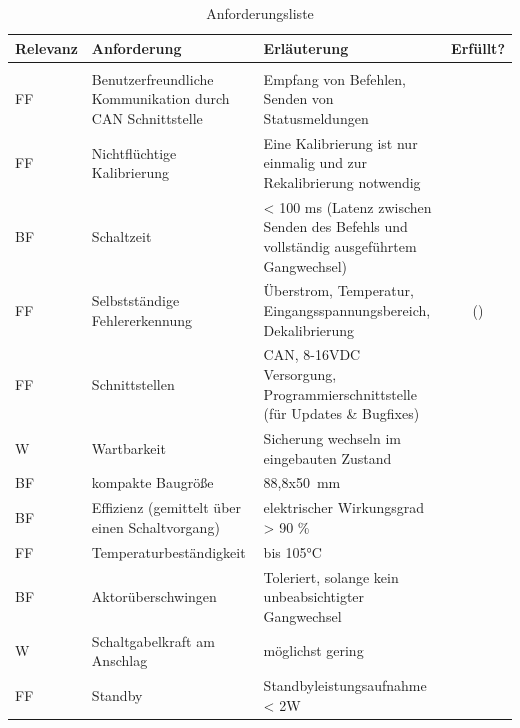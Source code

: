 \begin{table}[h]
	\centering
		\begin{tabular}{l|p{5cm}|p{7cm}|c}
			\textbf{Relevanz} & \textbf{Anforderung} & \textbf{Erläuterung} & Erfüllt?\\ \hline
			& &\\
			FF & Benutzerfreundliche Kommunikation durch CAN Schnittstelle & Empfang von Befehlen, Senden von Statusmeldungen & \checkmark\\ \hline
			FF & Nichtflüchtige Kalibrierung & Eine Kalibrierung ist nur einmalig und zur Rekalibrierung notwendig& \checkmark\\ \hline
			BF & Schaltzeit & < 100 ms (Latenz zwischen Senden des Befehls und vollständig ausgeführtem Gangwechsel)& \checkmark\\ \hline
			FF & Selbstständige Fehlererkennung & Überstrom, Temperatur, Eingangsspannungsbereich, Dekalibrierung& (\checkmark) \\ \hline
			FF & Schnittstellen & CAN, 8-16VDC Versorgung, Programmierschnittstelle (für Updates \& Bugfixes)& \checkmark \\ \hline
			W & Wartbarkeit & Sicherung wechseln im eingebauten Zustand& \checkmark\\ \hline
			BF & kompakte Baugröße & 88,8x\SI{50}{mm}&\checkmark \\ \hline
			BF & Effizienz (gemittelt über einen Schaltvorgang) & elektrischer Wirkungsgrad > 90 \% & \\ \hline
			FF & Temperaturbeständigkeit & bis 105°C& \checkmark \\ \hline
			BF & Aktorüberschwingen & Toleriert, solange kein unbeabsichtigter Gangwechsel& \checkmark
			\\ \hline
			W & Schaltgabelkraft am Anschlag & möglichst gering& \checkmark \\ \hline
			FF & Standby & Standbyleistungsaufnahme < 2W& \checkmark \\ \hline
		\end{tabular}
	\caption{Anforderungsliste}
	\label{tab:Anforderungsliste}
\end{table}